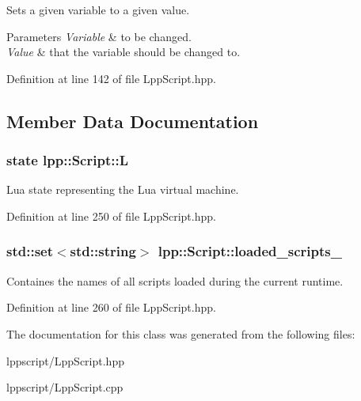 Sets a given variable to a given value. 


\begin{DoxyParams}{Parameters}
{\em Variable} & to be changed. \\
\hline
{\em Value} & that the variable should be changed to. \\
\hline
\end{DoxyParams}


Definition at line 142 of file Lpp\+Script.\+hpp.



\subsection{Member Data Documentation}
\subsubsection[{\texorpdfstring{L}{L}}]{\setlength{\rightskip}{0pt plus 5cm}state lpp\+::\+Script\+::L\hspace{0.3cm}{\ttfamily [private]}}\hypertarget{classlpp_1_1_script_a1bf67bd893423cb0e6cc4121957ff33d}{}\label{classlpp_1_1_script_a1bf67bd893423cb0e6cc4121957ff33d}


Lua state representing the Lua virtual machine. 



Definition at line 250 of file Lpp\+Script.\+hpp.

\subsubsection[{\texorpdfstring{loaded\+\_\+scripts\+\_\+}{loaded_scripts_}}]{\setlength{\rightskip}{0pt plus 5cm}std\+::set$<$std\+::string$>$ lpp\+::\+Script\+::loaded\+\_\+scripts\+\_\+\hspace{0.3cm}{\ttfamily [private]}}\hypertarget{classlpp_1_1_script_abf7d2cb96488dea057fd2d9d3fedb144}{}\label{classlpp_1_1_script_abf7d2cb96488dea057fd2d9d3fedb144}


Containes the names of all scripts loaded during the current runtime. 



Definition at line 260 of file Lpp\+Script.\+hpp.



The documentation for this class was generated from the following files\+:\begin{DoxyCompactItemize}
\item 
lppscript/Lpp\+Script.\+hpp\item 
lppscript/Lpp\+Script.\+cpp\end{DoxyCompactItemize}
